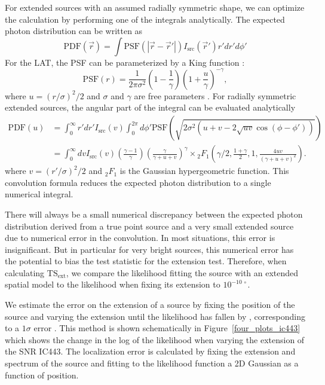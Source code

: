 \documentclass[12pt,preprint]{aastex}
\newcommand{\tsext}{{\ensuremath{\text{TS}_{\text{ext}}}}\xspace}
\begin{document}
For extended sources with an assumed radially symmetric shape,
we can optimize the calculation by performing one
of the integrals analytically.
The expected photon 
distribution can be written as
\begin{equation}
  \text{PDF}(\vec r) = \int  \text{PSF}(|\vec r - \vec r'|)I_\text{src}(\vec r') r' dr' d\phi'
\end{equation}
For the LAT, the PSF can be parameterized by a King function \citep{king_function}:
\begin{equation}
  \text{PSF}(r) = 
  \frac{1}{2\pi\sigma^2}
  \left(1-\frac{1}{\gamma}\right)
  \left(1+\frac{u}{\gamma}\right)^{-\gamma},
\end{equation}
where $u=(r/\sigma)^2/2$ and $\sigma$ and $\gamma$ are free parameters
\citep{matthew_kerr_thesis}.  For radially symmetric extended sources,
the angular part of the integral can be evaluated analytically
\begin{align}
  \text{PDF}(u) & = \int_0^\infty r' dr'
  I_\text{src}(v) 
  \int_0^{2\pi} d\phi' 
  \text{PSF}(\sqrt{2\sigma^2(u+v-2\sqrt{uv}\cos(\phi-\phi'))})
  \\
  & = \int_0^\infty dv
  I_\text{src}(v) 
  \left(\frac{\gamma-1}{\gamma}\right)
  \left( \frac{\gamma}{\gamma + u + v}\right)^\gamma 
  \times {}_2F_1 \left(\gamma/2,\frac{1+\gamma}{2},1,\frac{4uv}{(\gamma+u+v)^2}\right).
\end{align}
where $v=(r'/\sigma)^2/2$ and ${}_2F_1$ is the Gaussian hypergeometric
function.  This convolution formula reduces the expected photon
distribution to a single numerical integral.

There will always be a small numerical discrepancy between the expected
photon distribution derived from a true point source and a very small
extended source due to numerical error in the convolution.  In most
situations, this error is insignificant.  But in particular for
very bright sources, this numerical error has the potential to bias the
test statistic for the extension test. Therefore, when calculating
\tsext, we compare the likelihood fitting the source with an extended
spatial model to the likelihood when fixing its extension to $10^{-10\,\circ}$.

We estimate the error on the extension of a source by fixing
the position of the source and varying the extension until the
likelihood has fallen by \onehalf, corresponding to a $1\sigma$ error
\citep{Statistical_methods_book}.  This method is shown schematically in
Figure~\ref{four_plots_ic443} which shows the change in the log of the
likelihood when varying the extension of the SNR IC443.  The localization
error is calculated by fixing the extension and spectrum of the source
and fitting to the likelihood function a 2D Gaussian as a function
of position.
\end{document}
